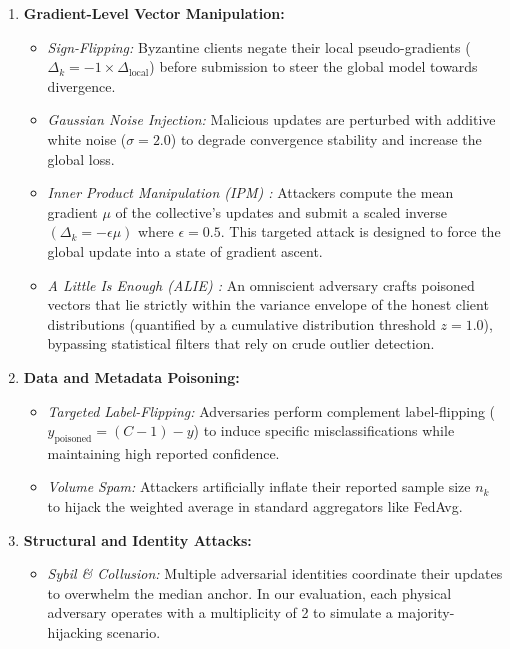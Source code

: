\documentclass[10pt, conference]{IEEEtran}
\begin{document}
\begin{enumerate}
    \item \textbf{Gradient-Level Vector Manipulation:}
    \begin{itemize}
        \item \textit{Sign-Flipping:} Byzantine clients negate their local pseudo-gradients ($\Delta_k = -1 \times \Delta_{\text{local}}$) before submission to steer the global model towards divergence.
        \item \textit{Gaussian Noise Injection:} Malicious updates are perturbed with additive white noise ($\sigma=2.0$) to degrade convergence stability and increase the global loss.
        \item \textit{Inner Product Manipulation (IPM) \cite{xie2020ipm}:} Attackers compute the mean gradient $\mu$ of the collective's updates and submit a scaled inverse $(\Delta_k = -\epsilon \mu)$ where $\epsilon=0.5$. This targeted attack is designed to force the global update into a state of gradient ascent.
        \item \textit{A Little Is Enough (ALIE) \cite{baruch2019}:} An omniscient adversary crafts poisoned vectors that lie strictly within the variance envelope of the honest client distributions (quantified by a cumulative distribution threshold $z=1.0$), bypassing statistical filters that rely on crude outlier detection.
    \end{itemize}
    
    \item \textbf{Data and Metadata Poisoning:}
    \begin{itemize}
        \item \textit{Targeted Label-Flipping:} Adversaries perform complement label-flipping ($y_{\text{poisoned}} = (C-1) - y$) to induce specific misclassifications while maintaining high reported confidence.
        \item \textit{Volume Spam:} Attackers artificially inflate their reported sample size $n_k$ to hijack the weighted average in standard aggregators like FedAvg.
    \end{itemize}
    
    \item \textbf{Structural and Identity Attacks:}
    \begin{itemize}
        \item \textit{Sybil \& Collusion:} Multiple adversarial identities coordinate their updates to overwhelm the median anchor. In our evaluation, each physical adversary operates with a multiplicity of 2 to simulate a majority-hijacking scenario.
    \end{itemize}
\end{enumerate}
\end{document}
